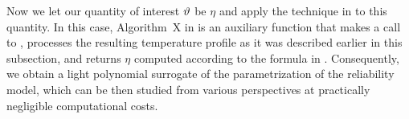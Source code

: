 Now we let our quantity of interest $\vartheta$ be $\eta$ and apply the technique in  to this quantity.
In this case, Algorithm~X in  is an auxiliary function that makes a call to , processes the resulting temperature profile as it was described earlier in this subsection, and returns $\eta$ computed according to the formula in .
Consequently, we obtain a light polynomial surrogate of the parametrization of the reliability model, which can be then studied from various perspectives at practically negligible computational costs.
